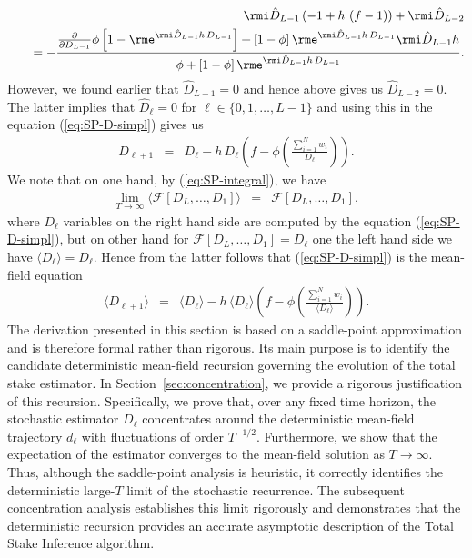 \documentclass[10pt]{iopart}
\newcommand{\1}{\mathbf{1}}
\begin{document}
%
\begin{eqnarray}
&&\rmi \hat{D}_{L-1}\left(- 1+ h\,\left(f- 1\right)\right)+\rmi \hat{D}_{L-2}\nonumber\\
&&~~~=-\frac{\frac{\partial}{\partial D_{L-1}}\phi\left[1-\rme^{\rmi \hat{D}_{L-1} h\,D_{L-1} }\right]+\left[1-\phi\right]\rme^{\rmi \hat{D}_{L-1} h\,D_{L-1} }\rmi \hat{D}_{L-1} h}{\phi+\left[1-\phi\right]\rme^{\rmi \hat{D}_{L-1} h\,D_{L-1} }}.
%
\end{eqnarray}
%
However, we found earlier that $\hat{D}_{L-1}=0$ and hence above gives us $\hat{D}_{L-2}=0$. The latter implies that $\hat{D}_{\ell}=0$ for $\ell\in\{0,1,\ldots,L-1\}$ and using this in the equation (\ref{eq:SP-D-simpl}) gives us 
%
\begin{eqnarray}
%
D_{\ell+1}&=&D_{\ell}- h\,D_{\ell}\left(f- \phi\left(\frac{\sum_{i=1}^Nw_i}{D_{\ell}}\right)\right)\label{eq:SP-D-simpl}.
%
\end{eqnarray}
%
We note that on one hand, by (\ref{eq:SP-integral}), we have 
%
\begin{eqnarray}
%
\lim_{T\to\infty}
\langle\mathcal{F}[D_{L},\ldots,D_{1}]\rangle&=&\mathcal{F}[D_{L},\ldots,D_{1}],
%
\end{eqnarray}
%
where $D_{\ell}$ variables on the right hand side are computed by the equation (\ref{eq:SP-D-simpl}), but on other hand for  $\mathcal{F}[D_{L},\ldots,D_{1}]=D_{\ell}$ one the left hand side we have $\langle D_{\ell} \rangle=D_{\ell}$. Hence from the latter follows that  (\ref{eq:SP-D-simpl}) is the mean-field equation 
%
%
\begin{eqnarray}
%
\langle D_{\ell+1}\rangle&=&\langle D_{\ell}\rangle- h\,\langle D_{\ell}\rangle\left(f- \phi\left(\frac{\sum_{i=1}^Nw_i}{\langle D_{\ell}\rangle}\right)\right)\label{eq:MF}.
%
\end{eqnarray}
%
The derivation presented in this section is based on a saddle-point approximation and is therefore formal rather than rigorous. Its main purpose is to identify the candidate deterministic mean-field recursion governing the evolution of the total stake estimator. In Section~\ref{sec:concentration}, we provide a rigorous justification of this recursion. Specifically, we prove that, over any fixed time horizon, the stochastic estimator $D_\ell$ concentrates around the deterministic mean-field trajectory $d_\ell$ with fluctuations of order $T^{-1/2}$. Furthermore, we show that the expectation of the estimator converges to the mean-field solution as $T\rightarrow\infty$. Thus, although the saddle-point analysis is heuristic, it correctly identifies the deterministic large-$T$ limit of the stochastic recurrence. The subsequent concentration analysis establishes this limit rigorously and demonstrates that the deterministic recursion provides an accurate asymptotic description of the Total Stake Inference algorithm.
\end{document}
